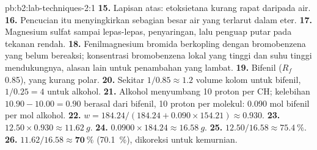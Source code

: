 \begin{solution}{pb:b2:lab-techniques-2:1}
\textbf{15.} Lapisan atas: etoksietana kurang rapat daripada air.
\textbf{16.} Pencucian itu menyingkirkan sebagian besar air yang terlarut dalam eter.
\textbf{17.} Magnesium sulfat sampai lepas-lepas, penyaringan, lalu penguap
putar pada tekanan rendah.
\textbf{18.} Fenilmagnesium bromida berkopling dengan bromobenzena yang belum
bereaksi; konsentrasi bromobenzena lokal yang tinggi dan suhu tinggi
mendukungnya, alasan lain untuk penambahan yang lambat.
\textbf{19.} Bifenil ($R_f$ 0.85), yang kurang polar.
\textbf{20.} Sekitar $1/0.85 \approx 1.2$ volume kolom untuk bifenil, $1/0.25 = 4$ untuk alkohol.
\textbf{21.} Alkohol menyumbang 10 proton  per CH; kelebihan
$10.90 - 10.00 = 0.90$ berasal dari bifenil, 10 proton per molekul: 0.090
mol bifenil per mol alkohol.
\textbf{22.} $w = 184.24/(184.24 + 0.090 \times 154.21) \approx 0.930$.
\textbf{23.} $12.50 \times 0.930 \approx \qty{11.62}{g}$.
\textbf{24.} $0.0900 \times 184.24 \approx \qty{16.58}{g}$.
\textbf{25.} $12.50/16.58 \approx 75.4~\%$.
\textbf{26.} $11.62/16.58 \approx \boldsymbol{70~\%}$ (70.1~\%), dikoreksi untuk kemurnian.
\end{solution}
